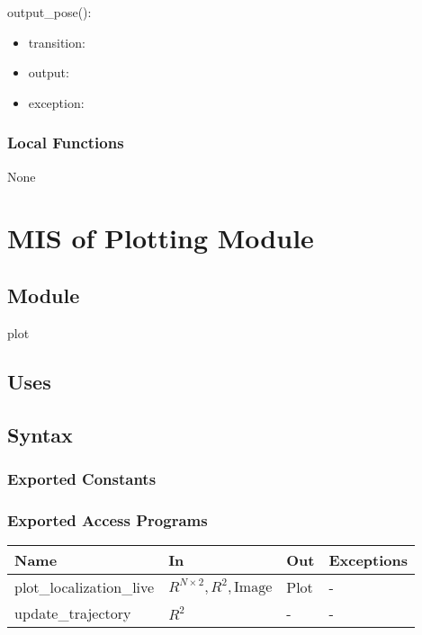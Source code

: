\documentclass[12pt, titlepage]{article}
\begin{document}
\noindent output\_pose():
\begin{itemize}
\item transition:  
\item output:  
\item exception:  
\end{itemize}


\subsubsection{Local Functions}
None

\newpage

\section{MIS of Plotting Module} \label{M_Plotting}

\subsection{Module}

plot 

\subsection{Uses}


\subsection{Syntax}

\subsubsection{Exported Constants}

\subsubsection{Exported Access Programs}

\begin{center}
\begin{tabular}{p{4cm} p{4cm} p{4cm} p{2cm}}
\hline
\textbf{Name} & \textbf{In} & \textbf{Out} & \textbf{Exceptions} \\
\hline
plot\_localization\_live & \( R^{N \times 2}, R^2, \text{Image} \) & Plot & - \\
\hline
update\_trajectory & \( R^2 \) & - & - \\
\hline
\end{tabular}
\end{center}
\end{document}
